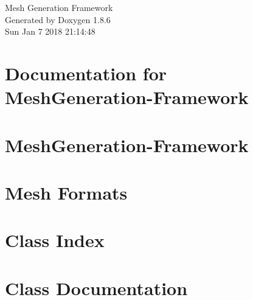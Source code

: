 \documentclass[twoside]{book}
\newcommand{\clearemptydoublepage}{%
  \newpage{\pagestyle{empty}\cleardoublepage}%
}
\begin{document}
\hypersetup{pageanchor=false}
\begin{titlepage}
\vspace*{7cm}
\begin{center}%
{\Large Mesh Generation Framework }\\
\vspace*{1cm}
{\large Generated by Doxygen 1.8.6}\\
\vspace*{0.5cm}
{\small Sun Jan 7 2018 21:14:48}\\
\end{center}
\end{titlepage}
\clearemptydoublepage
\tableofcontents
\clearemptydoublepage
{}
\hypersetup{pageanchor=true}

\chapter{Documentation for Mesh\-Generation-\/\-Framework}
\label{md_doc_README}
\hypertarget{md_doc_README}{}

\chapter{Mesh\-Generation-\/\-Framework}
\label{md_README}
\hypertarget{md_README}{}

\chapter{Mesh Formats}
\label{md_src_mesh_formats_README}
\hypertarget{md_src_mesh_formats_README}{}

\chapter{Class Index}

\chapter{Class Documentation}





















\newpage
{}
{}
\printindex
\end{document}
